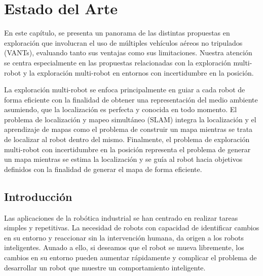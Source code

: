 \chapter{Estado del Arte}

En este capítulo, se presenta un panorama de las distintas propuestas en exploración que involucran el uso de múltiples vehículos aéreos no tripulados (VANTs), evaluando tanto sus ventajas como sus limitaciones. Nuestra atención se centra especialmente en las propuestas relacionadas con la exploración multi-robot y la exploración multi-robot en entornos con incertidumbre en la posición.


La exploración multi-robot se enfoca principalmente en guiar a cada robot de forma eficiente con la finalidad de obtener una representación del medio ambiente asumiendo, que la localización es perfecta y conocida en todo momento. El problema de localización y mapeo simultáneo (SLAM) integra la localización y el aprendizaje de mapas como el problema de construir un mapa mientras se trata de localizar al robot dentro del mismo. Finalmente, el problema de exploración multi-robot con incertidumbre en la posición representa el problema de generar un mapa mientras se estima la localización y se guía al robot hacia objetivos definidos con la finalidad de generar el mapa de forma eficiente.


\section{Introducción}

Las aplicaciones de la rob\'{o}tica industrial se han centrado en realizar tareas simples y repetitivas. La necesidad de robots con capacidad de identificar cambios en su entorno y reaccionar sin la intervenci\'{o}n humana, da origen a los robots inteligentes. Aunado a ello, si deseamos que el robot se mueva libremente, los cambios en su entorno pueden aumentar r\'{a}pidamente y complicar el problema de desarrollar un robot que muestre un comportamiento inteligente.

